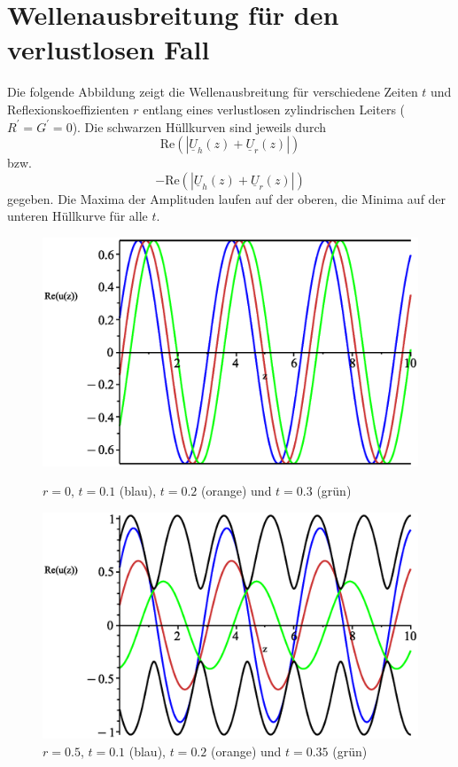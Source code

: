 \documentclass[paper=a4, parskip=half-, ngerman, fontsize=11pt]{scrreprt}
\begin{document}
\appendix

\chapter{Wellenausbreitung für den verlustlosen Fall}
Die folgende Abbildung zeigt die Wellenausbreitung für verschiedene Zeiten $t$ und Reflexionskoeffizienten
$r$ entlang eines verlustlosen zylindrischen Leiters (\mbox{$R^{\prime} = G^{\prime} = 0$}). Die schwarzen Hüllkurven
sind jeweils durch \[
\mathrm{Re} ( \left| \underline{U}_{h}(z) + \underline{U}_{r}(z) \right| )
\] bzw. \[
- \mathrm{Re} ( \left| \underline{U}_{h}(z) + \underline{U}_{r}(z) \right| )
\] gegeben. Die Maxima der Amplituden laufen auf der oberen, die Minima auf der unteren Hüllkurve für alle $t$.
\begin{figure}[H]
    \begin{minipage}{0.45\textwidth}
        \centering
        \includegraphics[width=\linewidth]{../graphics/Enveloppe/verlustlos/R0}
        \caption*{$r=0$, $t=0.1$ (blau), $t=0.2$ (orange) und $t=0.3$ (grün)}
    \end{minipage}\hfill
    \begin{minipage}{0.45\textwidth}
        \centering
        \includegraphics[width=\linewidth]{../graphics/Enveloppe/verlustlos/R0.5}
        \caption*{$r=0.5$, $t=0.1$ (blau), $t=0.2$ (orange) und $t=0.35$ (grün)}
    \end{minipage}


\end{figure}
\end{document}
